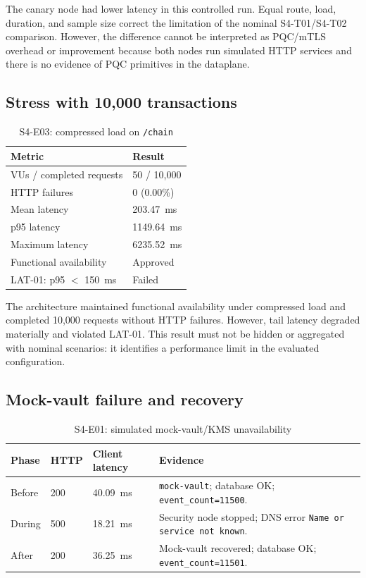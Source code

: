 \documentclass[12pt]{article}
\begin{document}
The canary node had lower latency in this controlled run. Equal route, load, duration, and sample size correct the limitation of the nominal S4-T01/S4-T02 comparison. However, the difference cannot be interpreted as PQC/mTLS overhead or improvement because both nodes run simulated HTTP services and there is no evidence of PQC primitives in the dataplane.

\subsection{Stress with 10,000 transactions}
\begin{table}[ht]
\centering
\caption{S4-E03: compressed load on \texttt{/chain}}
\label{tab:stress-en}
\small
\begin{tabularx}{\textwidth}{Yp{0.28\textwidth}}
\toprule
\textbf{Metric} & \textbf{Result} \\
\midrule
VUs / completed requests & 50 / 10,000 \\
HTTP failures & 0 (0.00\%) \\
Mean latency & 203.47~ms \\
p95 latency & 1149.64~ms \\
Maximum latency & 6235.52~ms \\
Functional availability & Approved \\
LAT-01: p95 $<$ 150~ms & Failed \\
\bottomrule
\end{tabularx}
\end{table}

The architecture maintained functional availability under compressed load and completed 10,000 requests without HTTP failures. However, tail latency degraded materially and violated LAT-01. This result must not be hidden or aggregated with nominal scenarios: it identifies a performance limit in the evaluated configuration.

\subsection{Mock-vault failure and recovery}
\begin{table}[ht]
\centering
\caption{S4-E01: simulated mock-vault/KMS unavailability}
\label{tab:kms-en}
\small
\begin{tabularx}{\textwidth}{p{}p{}p{}Y}
\toprule
\textbf{Phase} & \textbf{HTTP} & \textbf{Client latency} & \textbf{Evidence} \\
\midrule
Before & 200 & 40.09~ms & \texttt{mock-vault}; database OK; \texttt{event\_count=11500}. \\
During & 500 & 18.21~ms & Security node stopped; DNS error \texttt{Name or service not known}. \\
After & 200 & 36.25~ms & Mock-vault recovered; database OK; \texttt{event\_count=11501}. \\
\bottomrule
\end{tabularx}
\end{table}
\end{document}
